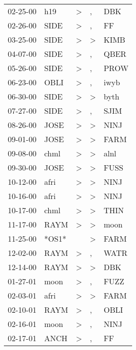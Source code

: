 \begin{supertabular}{lllll}
 02-25-00 &    h19 &     \textgreater &                , &    DBK \\
 02-26-00 &   SIDE &     \textgreater &                , &     FF \\
 03-25-00 &   SIDE &     \textgreater &     \textgreater &   KIMB \\
 04-07-00 &   SIDE &     \textgreater &                , &   QBER \\
 05-26-00 &   SIDE &     \textgreater &                , &   PROW \\
 06-23-00 &   OBLI &     \textgreater &                , &   iwyb \\
 06-30-00 &   SIDE &     \textgreater &     \textgreater &   byth \\
 07-27-00 &   SIDE &     \textgreater &                , &   SJIM \\
 08-26-00 &   JOSE &     \textgreater &     \textgreater &   NINJ \\
 09-01-00 &   JOSE &     \textgreater &     \textgreater &   FARM \\
 09-08-00 &   chml &     \textgreater &     \textgreater &   alnl \\
 09-30-00 &   JOSE &     \textgreater &     \textgreater &   FUSS \\
 10-12-00 &   afri &     \textgreater &     \textgreater &   NINJ \\
 10-16-00 &   afri &     \textgreater &     \textgreater &   NINJ \\
 10-17-00 &   chml &     \textgreater &     \textgreater &   THIN \\
 11-17-00 &   RAYM &     \textgreater &     \textgreater &   moon \\
 11-25-00 &  *OS1* &                  &     \textgreater &   FARM \\
 12-02-00 &   RAYM &     \textgreater &                , &   WATR \\
 12-14-00 &   RAYM &     \textgreater &     \textgreater &    DBK \\
 01-27-01 &   moon &     \textgreater &                , &   FUZZ \\
 02-03-01 &   afri &     \textgreater &     \textgreater &   FARM \\
 02-10-01 &   RAYM &     \textgreater &                , &   OBLI \\
 02-16-01 &   moon &     \textgreater &                , &   NINJ \\
 02-17-01 &   ANCH &     \textgreater &                , &     FF \\

\end{supertabular}
